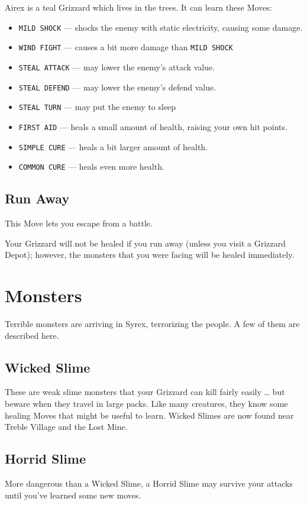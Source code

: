 \documentclass[10pt,twocolumn,openany,article]{memoir}
\begin{document}
\begin{description}
Airex is a teal Grizzard which lives in the trees. It can learn these Moves:

\begin{itemize}
\item \texttt{MILD SHOCK} --- shocks  the enemy with static electricity,
  causing some damage.
\item \texttt{WIND FIGHT} --- causes a bit more damage than \texttt{MILD SHOCK}
\item \texttt{STEAL ATTACK} --- may lower the enemy's attack value.
\item \texttt{STEAL DEFEND} --- may lower the enemy's defend value.
\item \texttt{STEAL TURN} --- may put the enemy to sleep
\item \texttt{FIRST  AID} ---  heals a small  amount of  health, raising
  your own hit points.
\item \texttt{SIMPLE CURE} --- heals a bit larger amount of health.
\item \texttt{COMMON CURE} --- heals even more health.
\end{itemize}

\fi

\section{Run Away}

This Move lets you escape from a battle.

Your  Grizzard will  not be  healed if  you run  away (unless  you visit
a  Grizzard Depot);  however, the  monsters  that you  were facing  will
be healed immediately.


\chapter{Monsters}

Terrible monsters are  arriving in Syrex, terrorizing the  people. A few
of them are described here.

\section*{Wicked Slime}
These are weak slime monsters that  your Grizzard can kill fairly easily
… but beware when they travel  in large packs. Like many creatures, they
know some healing Moves that might be useful to learn. Wicked Slimes are
now found near Treble Village and the Lost Mine.

\section*{Horrid Slime}
More dangerous  than a  Wicked Slime,  a Horrid  Slime may  survive your
attacks until you've learned some new moves.


\end{description}
\end{document}
